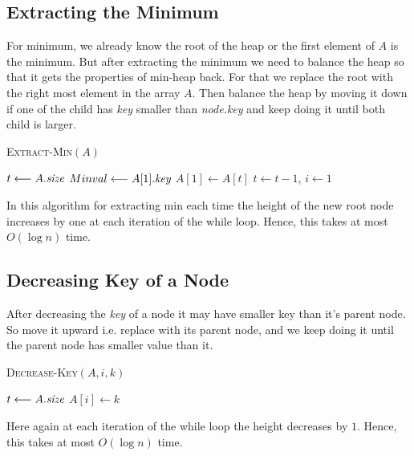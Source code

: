 \subsection{Extracting the Minimum}
For minimum, we already know the root of the heap or the first element of $A$ is the minimum. But after extracting the minimum we need to balance the heap so that it gets the properties of min-heap back. For that we replace the root with the right most element in the array $A$. Then balance the heap by moving it down if one of the child has \emph{key} smaller than \emph{node.key} and keep doing it until both child is larger.
\begin{algorithm}[]
	\caption{\textsc{Extract-Min}$(A)$}
	\DontPrintSemicolon
	$t\longleftarrow A.\emph{size}$\;
	$Minval\longleftarrow A[1].\emph{key}$\;
	$A[1]\longleftarrow A[t]$\;
	$t\longleftarrow t-1$, $i\longleftarrow 1$\;
\end{algorithm}

In this algorithm for extracting min each time the height of the new root node increases by one at each iteration of the while loop. Hence, this takes at most $O(\log n)$ time.
\subsection{Decreasing Key of a Node}
After decreasing the \emph{key} of a node it may have smaller key than it's parent node. So move it upward i.e. replace with its parent node, and we keep doing it until the parent node has smaller value than it.
\begin{algorithm}[]
	\caption{\textsc{Decrease-Key}$(A,i,k)$}
	\DontPrintSemicolon
	$t\longleftarrow A.\emph{size}$\;
	$A[i]\longleftarrow k$\;
\end{algorithm}
Here again at each iteration of the while loop the height decreases by $1$. Hence, this takes at most $O(\log n)$ time.
